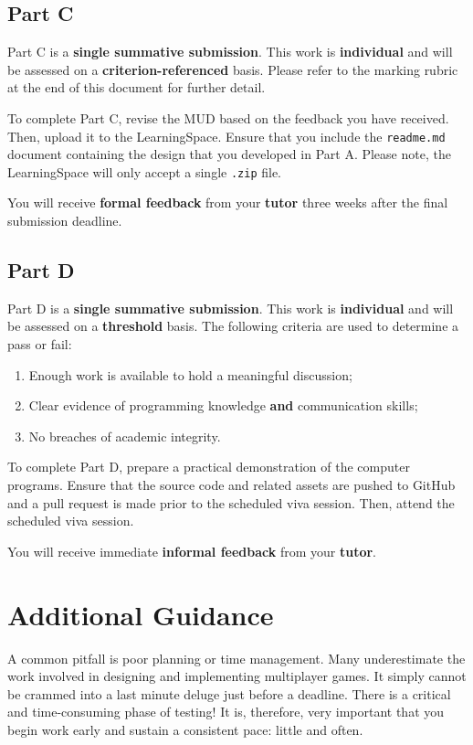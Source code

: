 \documentclass{../../../fal_assignment}
\begin{document}
\subsection*{Part C}

Part C is a \textbf{single summative submission}. This work is \textbf{individual} and will be assessed on a \textbf{criterion-referenced} basis. Please refer to the marking rubric at the end of this document for further detail.

To complete Part C, revise the MUD based on the feedback you have received. Then, upload it to the LearningSpace. Ensure that you include the \texttt{readme.md} document containing the design that you developed in Part A. Please note, the LearningSpace will only accept a single \texttt{.zip} file.

You will receive \textbf{formal feedback} from your \textbf{tutor} three weeks after the final submission deadline.

\subsection*{Part D}

Part D is a \textbf{single summative submission}. This work is \textbf{individual} and will be assessed on a \textbf{threshold} basis.  The following criteria are used to determine a pass or fail:

\begin{enumerate}[label=(\alph*)]
	\item Enough work is available to hold a meaningful discussion;
	\item Clear evidence of programming knowledge \textbf{and} communication skills;
	\item No breaches of academic integrity.
\end{enumerate}

To complete Part D, prepare a practical demonstration of the computer programs. Ensure that the source code and related assets are pushed to GitHub and a pull request is made prior to the scheduled viva session. Then, attend the scheduled viva session.

You will receive immediate \textbf{informal feedback} from your \textbf{tutor}.

\section*{Additional Guidance}

A common pitfall is poor planning or time management. Many underestimate the work involved in designing and implementing multiplayer games. It simply cannot be crammed into a last minute deluge just before a deadline. There is a critical and time-consuming phase of testing! It is, therefore, very important that you begin work early and sustain a consistent pace: little and often.
\end{document}
